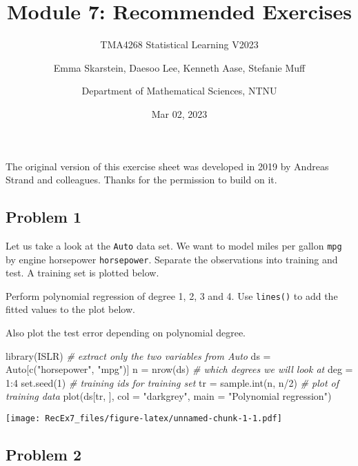 \documentclass[
]{article}
\title{Module 7: Recommended Exercises}
\subtitle{TMA4268 Statistical Learning V2023}
\author{Emma Skarstein, Daesoo Lee, Kenneth Aase, Stefanie
Muff \and Department of Mathematical Sciences, NTNU}
\date{Mar 02, 2023}
\newenvironment{Shaded}{\begin{snugshade}}{\end{snugshade}}
\newcommand{\AttributeTok}[1]{\textcolor[rgb]{0.77,0.63,0.00}{#1}}
\newcommand{\CommentTok}[1]{\textcolor[rgb]{0.56,0.35,0.01}{\textit{#1}}}
\newcommand{\DecValTok}[1]{\textcolor[rgb]{0.00,0.00,0.81}{#1}}
\newcommand{\FunctionTok}[1]{\textcolor[rgb]{0.00,0.00,0.00}{#1}}
\newcommand{\NormalTok}[1]{#1}
\newcommand{\OtherTok}[1]{\textcolor[rgb]{0.56,0.35,0.01}{#1}}
\newcommand{\SpecialCharTok}[1]{\textcolor[rgb]{0.00,0.00,0.00}{#1}}
\newcommand{\StringTok}[1]{\textcolor[rgb]{0.31,0.60,0.02}{#1}}
\begin{document}
\maketitle

The original version of this exercise sheet was developed in 2019 by
Andreas Strand and colleagues. Thanks for the permission to build on it.

\hypertarget{problem-1}{%
\subsection{Problem 1}\label{problem-1}}

Let us take a look at the \texttt{Auto} data set. We want to model miles
per gallon \texttt{mpg} by engine horsepower \texttt{horsepower}.
Separate the observations into training and test. A training set is
plotted below.

Perform polynomial regression of degree 1, 2, 3 and 4. Use
\texttt{lines()} to add the fitted values to the plot below.

Also plot the test error depending on polynomial degree.

\begin{Shaded}
\begin{Highlighting}[]
\FunctionTok{library}\NormalTok{(ISLR)}
\CommentTok{\# extract only the two variables from Auto}
\NormalTok{ds }\OtherTok{=}\NormalTok{ Auto[}\FunctionTok{c}\NormalTok{(}\StringTok{"horsepower"}\NormalTok{, }\StringTok{"mpg"}\NormalTok{)]}
\NormalTok{n }\OtherTok{=} \FunctionTok{nrow}\NormalTok{(ds)}
\CommentTok{\# which degrees we will look at}
\NormalTok{deg }\OtherTok{=} \DecValTok{1}\SpecialCharTok{:}\DecValTok{4}
\FunctionTok{set.seed}\NormalTok{(}\DecValTok{1}\NormalTok{)}
\CommentTok{\# training ids for training set}
\NormalTok{tr }\OtherTok{=} \FunctionTok{sample.int}\NormalTok{(n, n}\SpecialCharTok{/}\DecValTok{2}\NormalTok{)}
\CommentTok{\# plot of training data}
\FunctionTok{plot}\NormalTok{(ds[tr, ], }\AttributeTok{col =} \StringTok{"darkgrey"}\NormalTok{, }\AttributeTok{main =} \StringTok{"Polynomial regression"}\NormalTok{)}
\end{Highlighting}
\end{Shaded}

\texttt{[image: RecEx7\_files/figure-latex/unnamed-chunk-1-1.pdf]}

\hypertarget{problem-2}{%
\subsection{Problem 2}\label{problem-2}}
\end{document}
